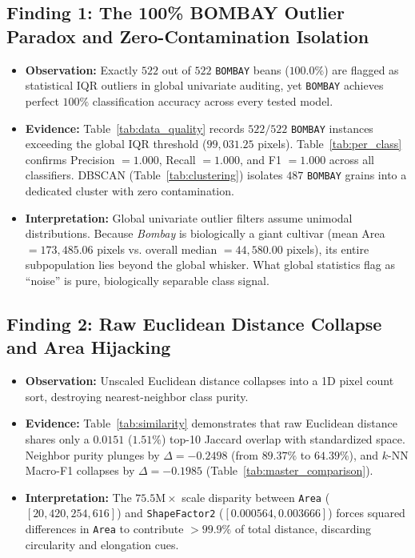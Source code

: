 \documentclass[11pt,a4paper]{article}
\begin{document}
\subsection{Finding 1: The 100\% BOMBAY Outlier Paradox and Zero-Contamination Isolation}
\begin{itemize}[leftmargin=1.5em]
    \item \textbf{Observation:} Exactly $522$ out of $522$ \texttt{BOMBAY} beans ($100.0\%$) are flagged as statistical IQR outliers in global univariate auditing, yet \texttt{BOMBAY} achieves perfect $100\%$ classification accuracy across every tested model.
    \item \textbf{Evidence:} Table~\ref{tab:data_quality} records $522/522$ \texttt{BOMBAY} instances exceeding the global IQR threshold ($99{,}031.25$ pixels). Table~\ref{tab:per_class} confirms Precision $= 1.000$, Recall $= 1.000$, and F1 $= 1.000$ across all classifiers. DBSCAN (Table~\ref{tab:clustering}) isolates $487$ \texttt{BOMBAY} grains into a dedicated cluster with zero contamination.
    \item \textbf{Interpretation:} Global univariate outlier filters assume unimodal distributions. Because \textit{Bombay} is biologically a giant cultivar (mean Area $= 173{,}485.06$ pixels vs. overall median $= 44{,}580.00$ pixels), its entire subpopulation lies beyond the global whisker. What global statistics flag as ``noise'' is pure, biologically separable class signal.
\end{itemize}

\subsection{Finding 2: Raw Euclidean Distance Collapse and Area Hijacking}
\begin{itemize}[leftmargin=1.5em]
    \item \textbf{Observation:} Unscaled Euclidean distance collapses into a 1D pixel count sort, destroying nearest-neighbor class purity.
    \item \textbf{Evidence:} Table~\ref{tab:similarity} demonstrates that raw Euclidean distance shares only a $0.0151$ ($1.51\%$) top-10 Jaccard overlap with standardized space. Neighbor purity plunges by $\Delta = -0.2498$ (from $89.37\%$ to $64.39\%$), and $k$-NN Macro-F1 collapses by $\Delta = -0.1985$ (Table~\ref{tab:master_comparison}).
    \item \textbf{Interpretation:} The $75.5\text{M}\times$ scale disparity between \texttt{Area} ($[20{,}420, 254{,}616]$) and \texttt{ShapeFactor2} ($[0.000564, 0.003666]$) forces squared differences in \texttt{Area} to contribute $> 99.9\%$ of total distance, discarding circularity and elongation cues.
\end{itemize}
\end{document}
